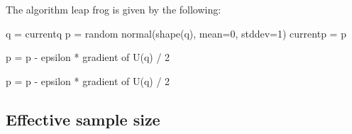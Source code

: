 \documentclass{article}
\begin{document}
\subsubsection{}
The algorithm leap frog is given by the following:
\\
\begin{algorithmic}[H]
	\STATE q = currentq 
	\STATE p = random normal(shape(q), mean=0, stddev=1) 
	\STATE currentp = p 

	\STATE p = p - epsilon * gradient of U(q) / 2 
	
	  \ENDFOR
	
	p = p - epsilon * gradient of U(q) / 2
	
	
\end{algorithmic}

\subsection{Effective sample size}
\end{document}
